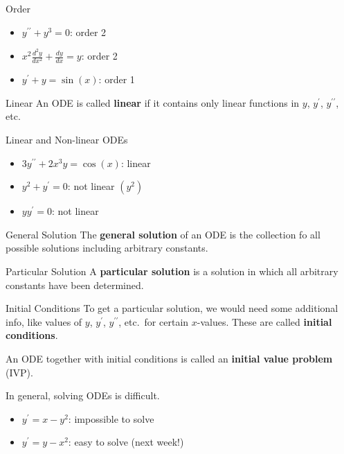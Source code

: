 \begin{Example}{Order}{}
    \begin{itemize}
        \item $ y^{\prime\prime}+y^3=0 $: order 2
        \item $ x^2 \frac{d^2y}{dx^2} +\frac{dy}{dx} =y $: order 2
        \item $ y^\prime+y=\sin(x) $: order 1
    \end{itemize}
\end{Example}

\begin{Definition}{Linear}{}
    An ODE is called \textbf{linear} if it contains only linear functions in $ y $, $ y^\prime $,
    $ y^{\prime\prime} $, etc.
\end{Definition}

\begin{Example}{Linear and Non-linear ODEs}{}
    \begin{itemize}
        \item $ 3y^{\prime\prime}+2x^3y=\cos(x) $: linear
        \item $ y^2+y^\prime=0 $: not linear $ (y^2) $
        \item $ yy^\prime=0 $: not linear
    \end{itemize}
\end{Example}

\begin{Definition}{General Solution}{}
    The \textbf{general solution} of an ODE is the collection fo all possible
    solutions including arbitrary constants.
\end{Definition}

\begin{Definition}{Particular Solution}{}
    A \textbf{particular solution} is a solution in which all arbitrary constants
    have been determined.
\end{Definition}

\begin{Definition}{Initial Conditions}{}
    To get a particular solution, we would need some additional info, like values of $ y $,
    $ y^\prime $, $ y^{\prime\prime} $, etc.\ for certain $ x $-values. These are
    called \textbf{initial conditions}.
\end{Definition}

An ODE together with initial conditions is called an \textbf{initial value problem} (IVP).

In general, solving ODEs is difficult.
\begin{Example}{}{}
    \begin{itemize}
        \item $ y^{\prime}=x-y^2 $: impossible to solve
        \item $ y^\prime=y-x^2 $: easy to solve (next week!)
    \end{itemize}
\end{Example}


